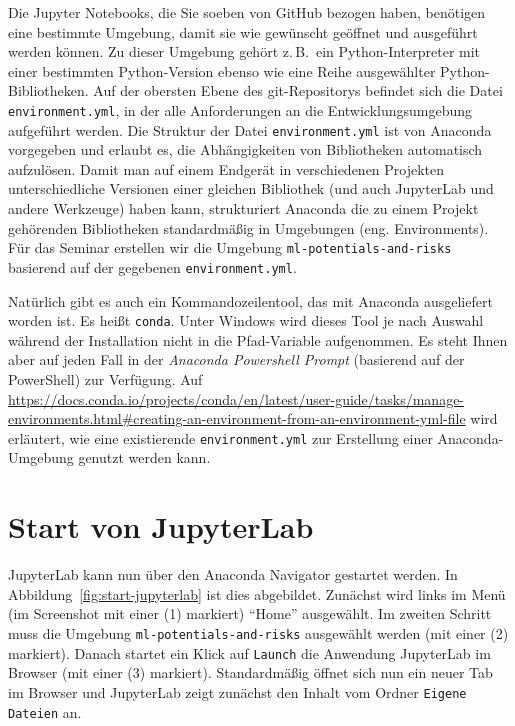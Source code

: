 \documentclass{tufte-handout}
\begin{document}
Die Jupyter Notebooks, die Sie soeben von GitHub bezogen haben, benötigen eine bestimmte Umgebung, damit sie wie gewünscht geöffnet und ausgeführt werden können.
Zu dieser Umgebung gehört z.\,B.\ ein Python-Interpreter mit einer bestimmten Python-Version ebenso wie eine Reihe ausgewählter Python-Bibliotheken.
Auf der obersten Ebene des git-Repositorys befindet sich die Datei \texttt{environment.yml}, in der alle Anforderungen an die Entwicklungsumgebung aufgeführt werden.
Die Struktur der Datei \texttt{environment.yml} ist von Anaconda vorgegeben und erlaubt es, die Abhängigkeiten von Bibliotheken automatisch aufzulösen.
Damit man auf einem Endgerät in verschiedenen Projekten unterschiedliche Versionen einer gleichen Bibliothek (und auch JupyterLab und andere Werkzeuge) haben kann,
strukturiert Anaconda die zu einem Projekt gehörenden Bibliotheken standardmäßig in Umgebungen (eng. Environments).
Für das Seminar erstellen wir die Umgebung
\texttt{ml-potentials-and-risks}
basierend auf der gegebenen \texttt{environment.yml}.

Natürlich gibt es auch ein Kommandozeilentool, das mit Anaconda ausgeliefert worden ist.
Es heißt \texttt{conda}.
Unter Windows wird dieses Tool je nach Auswahl während der Installation nicht in die Pfad-Variable aufgenommen.
Es steht Ihnen aber auf jeden Fall in der
\emph{Anaconda Powershell Prompt} (basierend auf der PowerShell)
zur Verfügung.
Auf
\url{https://docs.conda.io/projects/conda/en/latest/user-guide/tasks/manage-environments.html#creating-an-environment-from-an-environment-yml-file}
wird erläutert, wie eine existierende \texttt{environment.yml} zur Erstellung einer Anaconda-Umgebung genutzt werden kann.

\section{Start von JupyterLab}

JupyterLab kann nun über den Anaconda Navigator gestartet werden.
In Abbildung~\ref{fig:start-jupyterlab} ist dies abgebildet.
Zunächst wird links im Menü
(im Screenshot mit einer (1) markiert)
\enquote{Home} ausgewählt.
Im zweiten Schritt muss die Umgebung
\texttt{ml-potentials-and-risks}
ausgewählt werden
(mit einer (2) markiert).
Danach startet ein Klick auf \texttt{Launch} die Anwendung JupyterLab im Browser
(mit einer (3) markiert).
Standardmäßig öffnet sich nun ein neuer Tab im Browser und JupyterLab zeigt zunächst den Inhalt vom Ordner \texttt{Eigene Dateien} an.
\end{document}
